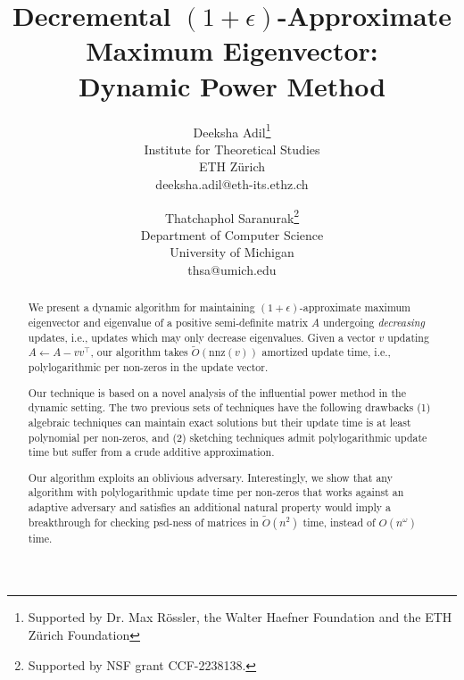 \documentclass[11pt]{article}
\newcommand{\deeksha}{\Authornote{Deeksha}}
\newcommand{\Authornote}[2]{{\sf\small\color{red}{[#1: #2]}}}
\newcommand{\Authornote}[2]{}
\begin{document}
	
	
	\title{Decremental $(1+\epsilon)$-Approximate Maximum Eigenvector:\\Dynamic Power Method}
	\author{Deeksha Adil\thanks{Supported by Dr. Max R\"ossler, the Walter Haefner Foundation and the ETH Z\"urich Foundation}\\Institute for Theoretical Studies\\ETH Zürich\\deeksha.adil@eth-its.ethz.ch \and Thatchaphol Saranurak\thanks{Supported by NSF grant CCF-2238138.}\\Department of Computer Science\\University of Michigan\\thsa@umich.edu}
	\maketitle
	
	
	\maketitle
	
	
	\begin{abstract}
		We present a dynamic algorithm for maintaining $(1+\epsilon)$-approximate maximum eigenvector and eigenvalue of a positive semi-definite matrix $A$ undergoing \emph{decreasing} updates, i.e., updates which may only decrease eigenvalues. Given a vector $v$ updating $A\gets A-vv^{\top}$, our algorithm takes $\tilde{O}(\mathrm{nnz}(v))$ amortized update time, i.e., polylogarithmic per non-zeros in the update vector.
		
		Our technique is based on a novel analysis of the influential power method in the dynamic setting. The two previous sets of techniques have the following drawbacks (1) algebraic techniques can maintain exact solutions but their update time is at least polynomial per non-zeros, and (2) sketching techniques admit polylogarithmic update time but suffer from a crude additive approximation.
		
		Our algorithm exploits an oblivious adversary. 
        Interestingly, we show that any algorithm with polylogarithmic update time per non-zeros that works against an adaptive adversary and satisfies an additional natural property would imply a breakthrough for checking psd-ness of matrices in $\tilde{O}(n^{2})$ time, instead of $O(n^{\omega})$ time.
	\end{abstract}
	
\end{document}
